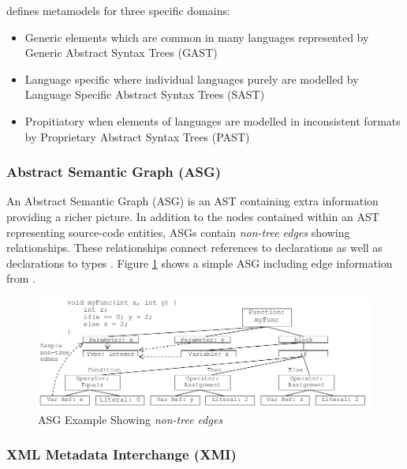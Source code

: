 \cite{omgastm} defines metamodels for three specific domains:
\begin{itemize}
\item Generic elements which are common in many languages represented by Generic Abstract Syntax Trees (GAST)
\item Language specific where individual languages purely are modelled by Language Specific Abstract Syntax Trees (SAST)
\item Propitiatory when elements of languages are modelled in inconsistent formats by Proprietary Abstract Syntax Trees (PAST)
\end{itemize}

\subsubsection{Abstract Semantic Graph (ASG)}\label{lit-reverseengineering-asg}

An Abstract Semantic Graph (ASG) is an AST containing extra information providing a richer picture. In addition to the nodes contained within an AST representing source-code entities, ASGs contain \textit{non-tree edges} showing relationships. These relationships connect references to declarations as well as declarations to types \citep{raghavan2004dex,mamas2000towards}. Figure \ref{fig-lit-reverseengineering-asgexample} shows a simple ASG including edge information from \cite{raghavan2004dex}.

\begin{figure}[hbtp]
\centering
\includegraphics[scale=0.6]{sections/literature/reverseengineering/asg-example-raghavan}
\caption{ASG Example Showing \textit{non-tree edges} \citep{raghavan2004dex}}
\label{fig-lit-reverseengineering-asgexample}
\end{figure}

\subsubsection{XML Metadata Interchange (XMI)}\label{lit-reverseengineering-xmi}

